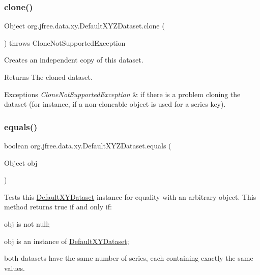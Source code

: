 \subsubsection{\texorpdfstring{clone()}{clone()}}
{\footnotesize\ttfamily Object org.\+jfree.\+data.\+xy.\+Default\+X\+Y\+Z\+Dataset.\+clone (\begin{DoxyParamCaption}{ }\end{DoxyParamCaption}) throws Clone\+Not\+Supported\+Exception}

Creates an independent copy of this dataset.

\begin{DoxyReturn}{Returns}
The cloned dataset.
\end{DoxyReturn}

\begin{DoxyExceptions}{Exceptions}
{\em Clone\+Not\+Supported\+Exception} & if there is a problem cloning the dataset (for instance, if a non-\/cloneable object is used for a series key). \\
\hline
\end{DoxyExceptions}
\mbox{\label{classorg_1_1jfree_1_1data_1_1xy_1_1_default_x_y_z_dataset_a984bc6f24ecc9b08c3d87251a543058d}} 
\subsubsection{\texorpdfstring{equals()}{equals()}}
{\footnotesize\ttfamily boolean org.\+jfree.\+data.\+xy.\+Default\+X\+Y\+Z\+Dataset.\+equals (\begin{DoxyParamCaption}\item[{Object}]{obj }\end{DoxyParamCaption})}

Tests this {\ttfamily \mbox{\hyperlink{classorg_1_1jfree_1_1data_1_1xy_1_1_default_x_y_dataset}{Default\+X\+Y\+Dataset}}} instance for equality with an arbitrary object. This method returns {\ttfamily true} if and only if\+: 
\begin{DoxyItemize}
\item {\ttfamily obj} is not {\ttfamily null}; 
\item {\ttfamily obj} is an instance of {\ttfamily \mbox{\hyperlink{classorg_1_1jfree_1_1data_1_1xy_1_1_default_x_y_dataset}{Default\+X\+Y\+Dataset}}}; 
\item both datasets have the same number of series, each containing exactly the same values. 
\end{DoxyItemize}


